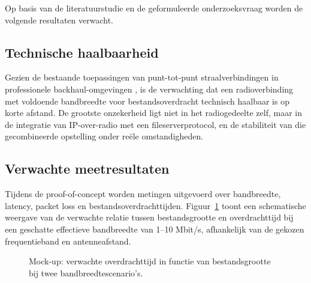 

Op basis van de literatuurstudie en de geformuleerde onderzoeksvraag worden de volgende resultaten verwacht.

\subsection{Technische haalbaarheid}

Gezien de bestaande toepassingen van punt-tot-punt straalverbindingen in professionele backhaul-omgevingen \autocite{WirelessBackhaulSurvey, MicrowavePtP5G}, is de verwachting dat een radioverbinding met voldoende bandbreedte voor bestandsoverdracht technisch haalbaar is op korte afstand. De grootste onzekerheid ligt niet in het radiogedeelte zelf, maar in de integratie van IP-over-radio met een fileserverprotocol, en de stabiliteit van die gecombineerde opstelling onder reële omstandigheden.

\subsection{Verwachte meetresultaten}

Tijdens de proof-of-concept worden metingen uitgevoerd over bandbreedte, latency, packet loss en bestandsoverdrachttijden. Figuur~\ref{fig:mock_bandbreedte} toont een schematische weergave van de verwachte relatie tussen bestandsgrootte en overdrachttijd bij een geschatte effectieve bandbreedte van 1--10 Mbit/s, afhankelijk van de gekozen frequentieband en antenneafstand.

\begin{figure}[h]
  \centering
  \caption{Mock-up: verwachte overdrachttijd in functie van bestandsgrootte bij twee bandbreedtescenario's.}
  \label{fig:mock_bandbreedte}
\end{figure}

